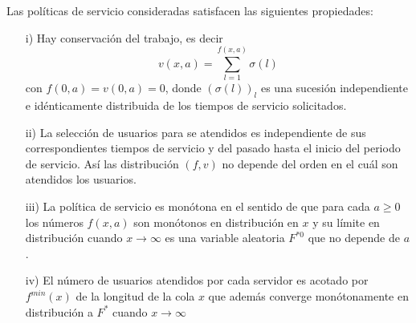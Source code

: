 Las pol\'iticas de servicio consideradas satisfacen las siguientes
propiedades:

\begin{itemize}
\item[i)] Hay conservaci\'on del trabajo, es decir
\[v\left(x,a\right)=\sum_{l=1}^{f\left(x,a\right)}\sigma\left(l\right)\]
con $f\left(0,a\right)=v\left(0,a\right)=0$, donde
$\left(\sigma\left(l\right)\right)_{l}$ es una sucesi\'on
independiente e id\'enticamente distribuida de los tiempos de
servicio solicitados. \item[ii)] La selecci\'on de usuarios para se
atendidos es independiente de sus correspondientes tiempos de
servicio y del pasado hasta el inicio del periodo de servicio. As\'i
las distribuci\'on $\left(f,v\right)$ no depende del orden en el
cu\'al son atendidos los usuarios. \item[iii)] La pol\'itica de
servicio es mon\'otona en el sentido de que para cada $a\geq0$ los
n\'umeros $f\left(x,a\right)$ son mon\'otonos en distribuci\'on en $x$ y
su l\'imite en distribuci\'on cuando $x\rightarrow\infty$ es una
variable aleatoria $F^{*0}$ que no depende de $a$. \item[iv)] El
n\'umero de usuarios atendidos por cada servidor es acotado por
$f^{min}\left(x\right)$ de la longitud de la cola $x$ que adem\'as
converge mon\'otonamente en distribuci\'on a $F^{*}$ cuando
$x\rightarrow\infty$
\end{itemize}

